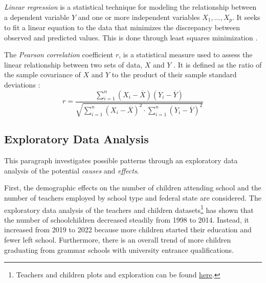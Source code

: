 \emph{Linear regression} is a statistical technique for modeling the relationship between a dependent variable $Y$ and one or more independent variables $X_1,...,X_p$. It seeks to fit a linear equation to the data that minimizes the discrepancy between observed and predicted values. This is done through least squares minimization \cite{james_introduction_2021}.


The \emph{Pearson correlation} coefficient $r$, is a statistical measure used to assess the linear relationship between two sets of data, $X$ and $Y$ \cite{rodgers_thirteen_1988}. It is defined as the ratio of the sample covariance of $X$ and $Y$ to the product of their sample standard deviations \cite{rodgers_thirteen_1988}:
\begin{equation}
    r = \frac{\sum_{i=1}^n (X_i - \overline{X}) (Y_i - \overline{Y})}{\sqrt{\sum_{i=1}^n(X_i-\overline{X})^2 \cdot \sum_{i=1}^n(Y_i-\overline{Y})^2}}
\end{equation}

\subsection{Exploratory Data Analysis}\label{sec:analysis}

This paragraph investigates possible patterns through an exploratory data analysis of the potential \emph{causes} and \emph{effects}. 

First, the demographic effects on the number of children attending school and the number of teachers employed by school type and federal state are considered. The exploratory data analysis of the teachers and children datasets\footnote{\label{footnote:teachers-children}Teachers and children plots and exploration can be found \href{https://github.com/KarylReyne/DataLiteracyWS23/blob/main/exp/TF-005-TeachersToChildren.ipynb}{here}.} has shown that the number of schoolchildren decreased steadily from 1998 to 2014. Instead, it increased from 2019 to 2022 because more children started their education and fewer left school. Furthermore, there is an overall trend of more children graduating from grammar schools with university entrance qualifications.

